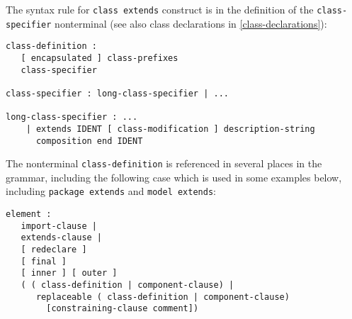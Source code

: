 The syntax rule for \lstinline!class extends! construct is in the definition of the
\lstinline!class-specifier! nonterminal (see also class declarations in \cref{class-declarations}):
\begin{lstlisting}[language=grammar]
class-definition :
   [ encapsulated ] class-prefixes
   class-specifier

class-specifier : long-class-specifier | ...

long-class-specifier : ...
    | extends IDENT [ class-modification ] description-string
      composition end IDENT
\end{lstlisting}
The nonterminal \lstinline!class-definition! is referenced in several places in the
grammar, including the following case which is used in some examples
below, including \lstinline!package extends! and \lstinline!model extends!:
\begin{lstlisting}[language=grammar]
element :
   import-clause |
   extends-clause |
   [ redeclare ]
   [ final ]
   [ inner ] [ outer ]
   ( ( class-definition | component-clause) |
      replaceable ( class-definition | component-clause)
        [constraining-clause comment])
\end{lstlisting}

